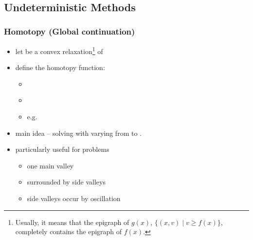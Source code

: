 \subsection{Undeterministic Methods}
	\subsubsection{Homotopy (Global continuation)}
	\begin{itemize}
		\item let  be a convex relaxation\footnote{Usually, it means that the epigraph of $g(x)$,
			$\{(x,v)\mid v\geq f(x)  \}$, completely contains the epigraph of $f(x)$.} of 
		\item define the homotopy function: 
		\begin{itemize}
			\item {}\\[1mm]
			\item {}\\[1mm]
			\item e.g. 
		\end{itemize}
		\item main idea -- solving
		with  varying from  to .
		\item particularly useful for problems
		\begin{itemize}
			\item one main valley
			\item surrounded by side valleys
			\item side valleys occur by oscillation
		\end{itemize}
	\end{itemize}


